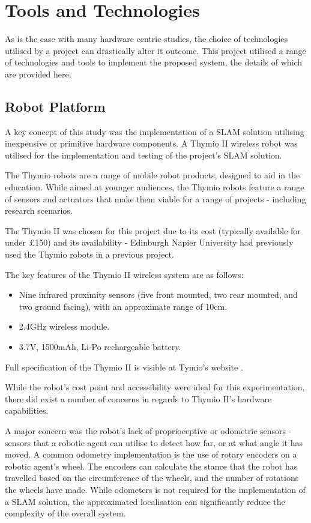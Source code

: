 \section{Tools and Technologies}
As is the case with many hardware centric studies, the choice of technologies
utilised by a project can drastically alter it outcome.
This project utilised a range of technologies and tools to implement the
proposed system, the details of which are provided here.

\subsection{Robot Platform}
A key concept of this study was the implementation of a SLAM solution
utilising inexpensive or primitive hardware components.
A Thymio II wireless robot was utilised for the implementation and testing of
the project's SLAM solution.

The Thymio robots are a range of mobile robot products, designed to aid in the
education.
While aimed at younger audiences, the Thymio robots feature a range of
sensors and actuators that make them viable for a range of projects -
including research scenarios.

The Thymio II was chosen for this project due to its cost (typically available
for under £150) and its availability  - Edinburgh Napier University had
previously used the Thymio robots in a previous project.


The key features of the Thymio II wireless system are as follows:
\begin{itemize}
\item Nine infrared proximity sensors (five front mounted, two rear mounted,
and two ground facing), with an approximate range of 10cm.
\item 2.4GHz wireless module.
\item 3.7V, 1500mAh, Li-Po rechargeable battery.
\end{itemize}
Full specification of the Thymio II is visible at Tymio's website
\cite{thymio}.

While the robot's cost point and accessibility were ideal for this
experimentation, there did exist a number of concerns in regards to Thymio
II's hardware capabilities.

A major concern was the robot's lack of proprioceptive or odometric sensors -
sensors that a robotic agent can utilise to detect how far, or at what angle
it has moved.
A common odometry implementation is the use of rotary encoders on a robotic
agent's wheel.
The encoders can calculate the stance that the robot has travelled based on
the circumference of the wheels, and the number of rotations the wheels have
made.
While odometers is not required for the implementation of a SLAM solution, the
approximated localisation can significantly reduce the complexity of the
overall system.

